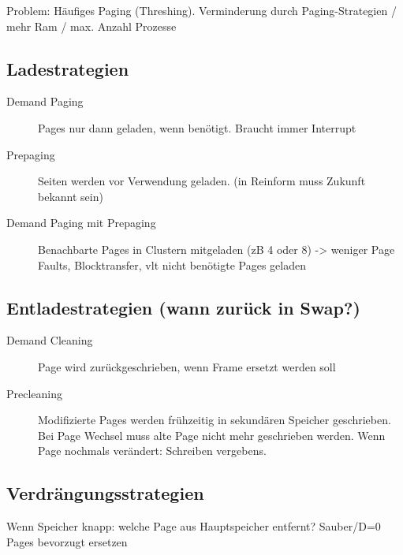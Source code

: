 \begin{multicols*}{4}
Problem: Häufiges Paging (Threshing). Verminderung durch Paging-Strategien / mehr Ram / max. Anzahl Prozesse

\subsection{Ladestrategien}
\begin{description}
    \item[Demand Paging] Pages nur dann geladen, wenn benötigt. Braucht immer Interrupt
    \item[Prepaging] Seiten werden vor Verwendung geladen. (in Reinform muss Zukunft bekannt sein)
    \item[Demand Paging mit Prepaging] Benachbarte Pages in Clustern mitgeladen (zB 4 oder 8)
    -> weniger Page Faults, Blocktransfer, vlt nicht benötigte Pages geladen
\end{description}

\subsection{Entladestrategien (wann zurück in Swap?)}
\begin{description}
    \item[Demand Cleaning] Page wird zurückgeschrieben, wenn Frame ersetzt werden soll
    \item[Precleaning] Modifizierte Pages werden frühzeitig in sekundären Speicher geschrieben.
    Bei Page Wechsel muss alte Page nicht mehr geschrieben werden. Wenn Page nochmals verändert: Schreiben vergebens.
\end{description}

\subsection{Verdrängungsstrategien}
Wenn Speicher knapp: welche Page aus Hauptspeicher entfernt? Sauber/D=0 Pages bevorzugt ersetzen


\end{multicols*}

